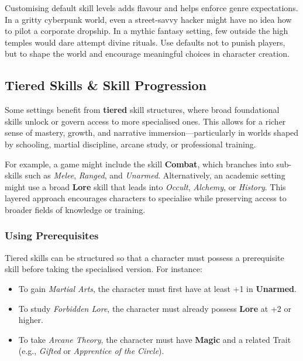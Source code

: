 Customising default skill levels adds flavour and helps enforce genre expectations. In a gritty cyberpunk world, even a street-savvy hacker might have no idea how to pilot a corporate dropship. In a mythic fantasy setting, few outside the high temples would dare attempt divine rituals. Use defaults not to punish players, but to shape the world and encourage meaningful choices in character creation.


\subsection{Tiered Skills \& Skill Progression}\label{toolbox:skill-progress}

Some settings benefit from \textbf{tiered} skill structures, where broad foundational skills unlock or govern access to more specialised ones. This allows for a richer sense of mastery, growth, and narrative immersion—particularly in worlds shaped by schooling, martial discipline, arcane study, or professional training.

For example, a game might include the skill \textbf{Combat}, which branches into sub-skills such as \textit{Melee}, \textit{Ranged}, and \textit{Unarmed}. Alternatively, an academic setting might use a broad \textbf{Lore} skill that leads into \textit{Occult}, \textit{Alchemy}, or \textit{History}. This layered approach encourages characters to specialise while preserving access to broader fields of knowledge or training.

\subsubsection*{Using Prerequisites}

Tiered skills can be structured so that a character must possess a prerequisite skill before taking the specialised version. For instance:

\begin{itemize}
    \item To gain \textit{Martial Arts}, the character must first have at least +1 in \textbf{Unarmed}.
    \item To study \textit{Forbidden Lore}, the character must already possess \textbf{Lore} at +2 or higher.
    \item To take \textit{Arcane Theory}, the character must have \textbf{Magic} and a related Trait (e.g., \textit{Gifted} or \textit{Apprentice of the Circle}).
\end{itemize}

